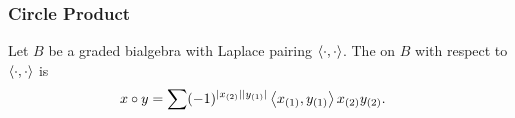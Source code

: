 \documentclass{beamer}
\begin{document}
%
%
%
%
%
%
%
%
%





\begin{frame}

\frametitle{Circle Product}


\begin{definition}{}{}
Let $B$ be a graded bialgebra with Laplace pairing $\left\langle \cdot,\cdot \right\rangle$. The  on $B$ with respect to $\left\langle \cdot,\cdot \right\rangle$ is
%
\begin{align*}
x \circ y &=  \sum (-1)^{| x_{(2)} | | y_{(1)} |} \left\langle x_{(1)}, y_{(1)} \right\rangle x_{(2)} y_{(2)}. 
\end{align*}

\end{definition}


\end{frame}




\end{document}
